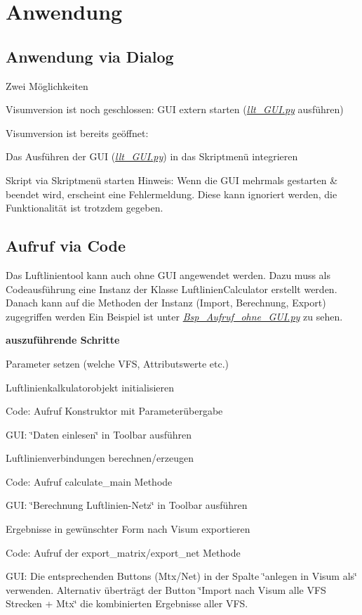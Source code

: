 \chapter{Anwendung}
\section{Anwendung via Dialog}
Zwei Möglichkeiten
\begin{DoxyItemize}
\item Visumversion ist noch geschlossen:
GUI extern starten ({\itshape \mbox{\hyperlink{llt___g_u_i_8py_source}{llt\_GUI.py}}} ausführen)
\item Visumversion ist bereits geöffnet:
\begin{DoxyItemize}
\item Das Ausführen der GUI ({\itshape \mbox{\hyperlink{llt___g_u_i_8py_source}{llt\_GUI.py}}}) in das Skriptmenü integrieren
\item Skript via Skriptmenü starten
Hinweis: Wenn die GUI mehrmals gestarten \& beendet wird, erscheint eine Fehlermeldung. Diese kann ignoriert werden, die Funktionalität ist trotzdem gegeben.
\end{DoxyItemize}
\end{DoxyItemize}
\section{Aufruf via Code}
Das Luftlinientool kann auch ohne GUI angewendet werden. Dazu muss als Codeausführung eine Instanz der Klasse LuftlinienCalculator erstellt werden. Danach kann auf die Methoden der Instanz (Import, Berechnung, Export) zugegriffen werden Ein Beispiel ist unter {\itshape \mbox{\hyperlink{_bsp___aufruf__ohne___g_u_i_8py_source}{Bsp\_Aufruf\_ohne\_GUI.py}}} zu sehen.

\textbf{auszuführende Schritte}
\begin{DoxyEnumerate}
\item Parameter setzen (welche VFS, Attributswerte etc.)
\item Luftlinienkalkulatorobjekt initialisieren

Code: Aufruf Konstruktor mit Parameterübergabe

GUI: \char`\"{}Daten einlesen\char`\"{} in Toolbar ausführen
\item Luftlinienverbindungen berechnen/erzeugen

Code: Aufruf calculate\_main Methode

GUI: \char`\"{}Berechnung Luftlinien-\/Netz\char`\"{} in Toolbar ausführen
\item Ergebnisse in gewünschter Form nach Visum exportieren

Code: Aufruf der export\_matrix/export\_net Methode

GUI: Die entsprechenden Buttons (Mtx/Net) in der Spalte \char`\"{}anlegen in Visum als\char`\"{} verwenden. Alternativ überträgt der Button \char`\"{}Import nach Visum alle VFS Strecken + Mtx\char`\"{} die kombinierten Ergebnisse aller VFS.
\end{DoxyEnumerate}

